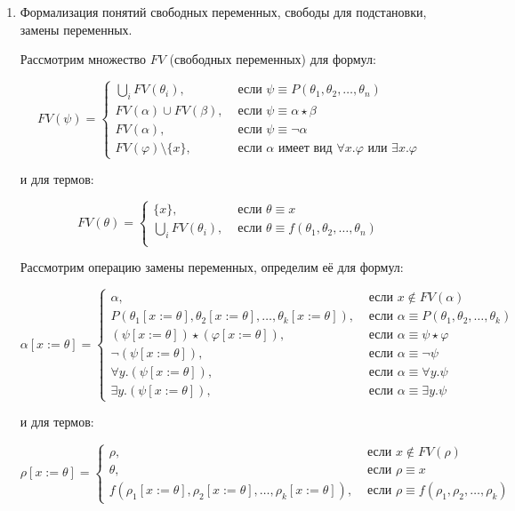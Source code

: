 \documentclass[10pt,a4paper,oneside]{article}
\begin{document}
\begin{enumerate}
\item Формализация понятий свободных переменных, свободы для подстановки, замены переменных.

Рассмотрим множество $FV$ (свободных переменных) для формул:

$$
FV(\psi) = \left\{ \begin{array}{rl}
  \bigcup_i FV(\theta_i),  &\mbox{ если $\psi\equiv P(\theta_1,\theta_2,\dots,\theta_n)$ } \\
  FV(\alpha) \cup FV(\beta),  &\mbox{ если $\psi\equiv\alpha\star\beta$ }\\
  FV(\alpha),  &\mbox{ если $\psi\equiv\neg\alpha$ }\\
  FV(\varphi) \setminus \{x\},  &\mbox{ если $\alpha$ имеет вид $\forall x.\varphi$ или $\exists x.\varphi$ }
       \end{array} \right.
$$

и для термов:

$$
FV(\theta) = \left\{ \begin{array}{rl}
  \{x\}, &\mbox{ если $\theta\equiv x$ }\\
  \bigcup_i FV(\theta_i),  &\mbox{ если $\theta \equiv f(\theta_1,\theta_2,\dots,\theta_n)$ } \\
\end{array} \right.
$$


Рассмотрим операцию замены переменных, определим её для формул:

$$
\alpha [x := \theta] = \left\{ \begin{array}{ll}
  \alpha, &\mbox{ если $x \notin FV(\alpha)$}\\
  P(\theta_1 [x := \theta], \theta_2 [x := \theta], \dots, \theta_k [x := \theta]), &\mbox{ если $\alpha\equiv P(\theta_1, \theta_2, \dots,\theta_k)$}\\
  (\psi [x := \theta]) \star (\varphi [x := \theta]), &\mbox{ если $\alpha\equiv\psi\star\varphi$ }\\
  \neg(\psi [x := \theta]), &\mbox{ если $\alpha\equiv\neg\psi$ }\\
  \forall y.(\psi [x := \theta]),  &\mbox{ если $\alpha\equiv\forall y.\psi$ }\\
  \exists y.(\psi [x := \theta]),  &\mbox{ если $\alpha\equiv\exists y.\psi$ }
       \end{array} \right.
$$

и для термов:

$$
\rho [x := \theta] = \left\{ \begin{array}{ll}
  \rho, &\mbox{ если $x \notin FV(\rho)$ }\\
  \theta, &\mbox{ если $\rho\equiv x$}\\
  f (\rho_1 [x := \theta], \rho_2 [x := \theta], \dots, \rho_k [x := \theta]), &\mbox{ если $\rho\equiv f(\rho_1,\rho_2,\dots,\rho_k)$ }
       \end{array} \right.
$$


\end{enumerate}
\end{document}
